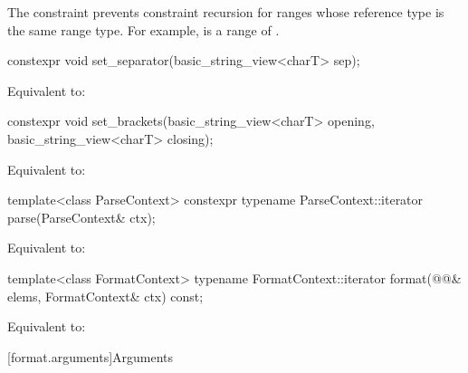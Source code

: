 \pnum
\begin{note}
The 
constraint prevents constraint recursion
for ranges whose reference type is the same range type.
For example, 
is a range of .
\end{note}

%
\begin{itemdecl}
constexpr void set_separator(basic_string_view<charT> sep);
\end{itemdecl}

\begin{itemdescr}
\pnum
\effects
Equivalent to: 
\end{itemdescr}

%
\begin{itemdecl}
constexpr void set_brackets(basic_string_view<charT> opening, basic_string_view<charT> closing);
\end{itemdecl}

\begin{itemdescr}
\pnum
\effects
Equivalent to: 
\end{itemdescr}

%
\begin{itemdecl}
template<class ParseContext>
  constexpr typename ParseContext::iterator
    parse(ParseContext& ctx);
\end{itemdecl}

\begin{itemdescr}
\pnum
\effects
Equivalent to: 
\end{itemdescr}

%
\begin{itemdecl}
template<class FormatContext>
  typename FormatContext::iterator
    format(@@& elems, FormatContext& ctx) const;
\end{itemdecl}

\begin{itemdescr}
\pnum
\effects
Equivalent to: 
\end{itemdescr}

[format.arguments]{Arguments}

